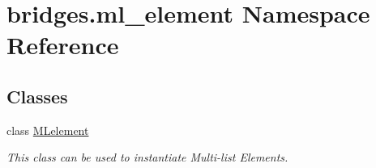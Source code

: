 \hypertarget{namespacebridges_1_1ml__element}{}\section{bridges.\+ml\+\_\+element Namespace Reference}
\label{namespacebridges_1_1ml__element}
\subsection*{Classes}
\begin{DoxyCompactItemize}
\item 
class \mbox{\hyperlink{classbridges_1_1ml__element_1_1_m_lelement}{M\+Lelement}}
\begin{DoxyCompactList}\small\item\em This class can be used to instantiate Multi-\/list Elements. \end{DoxyCompactList}\end{DoxyCompactItemize}
